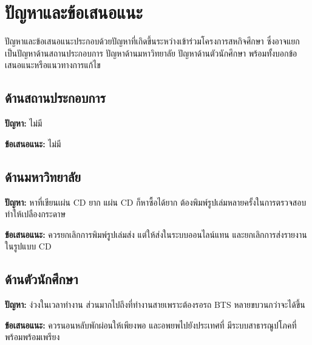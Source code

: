 \chapter{ปัญหาและข้อเสนอแนะ}
\label{chapter:result}

ปัญหาและข้อเสนอแนะประกอบด้วยปัญหาที่เกิดขึ้นระหว่างเข้าร่วมโครงการสหกิจศึกษา ซึ่งอาจแยกเป็นปัญหาด้านสถานประกอบการ ปัญหาด้านมหาวิทยาลัย ปัญหาด้านตัวนักศึกษา พร้อมทั้งบอกข้อเสนอแนะหรือแนวทางการแก้ไข 

\section{ด้านสถานประกอบการ}

\textbf{ปัญหา:} ไม่มี

\textbf{ข้อเสนอแนะ:} ไม่มี

\section{ด้านมหาวิทยาลัย}

\textbf{ปัญหา:} หาที่เขียนเผ่น CD ยาก แผ่น CD ก็หาซื้อได้ยาก ต้องพิมพ์รูปเล่มหลายครั้งในการตรวจสอบ ทำให้เปลืองกระดาษ

\textbf{ข้อเสนอแนะ:} ควรยกเลิกการพิมพ์รูปเล่มส่ง แต่ให้ส่งในระบบออนไลน์แทน และยกเลิกการส่งรายงานในรูปแบบ CD

\section{ด้านตัวนักศึกษา}

\textbf{ปัญหา:} ง่วงในเวลาทำงาน ส่วนมากไปถึงที่ทำงานสายเพราะต้องรอรถ BTS หลายขบวนกว่าจะได้ขึ้น

\textbf{ข้อเสนอแนะ:} ควรนอนหลับพักผ่อนให้เพียงพอ และอพยพไปยังประเทศที่ มีระบบสาธารณูปโภคที่พร้อมพร้อมเพรียง